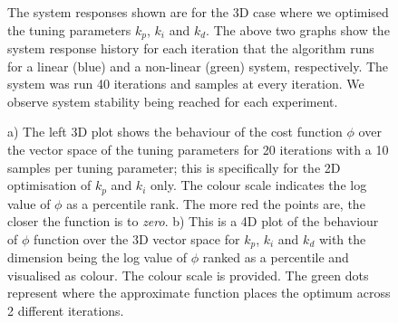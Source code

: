 \documentclass[conference]{IEEEtran}
\theoremstyle{definition}
\begin{document}
\begin{figure}[h]
    \caption{The system responses shown are for the 3D case where we optimised the tuning parameters $k_p$, $k_i$ and $k_d$. The above two graphs show the system response history for each iteration that the algorithm runs for a linear (blue) and a non-linear (green) system, respectively. The system was run 40 iterations and samples at every  iteration. We observe system stability being reached for each experiment.}
    \label{kpkikd}
\end{figure}

\begin{figure}[h]
    \caption{a) The left 3D plot shows the behaviour of the cost function $\phi$ over the vector space of the tuning parameters for 20 iterations with a 10 samples per tuning parameter; this is specifically for the 2D optimisation of $k_p$ and $k_i$ only. The colour scale indicates the log value of $\phi$ as a percentile rank. The more red the points are, the closer the function is to \textit{zero}. b) This is a 4D plot of the behaviour of $\phi$ function over the 3D vector space for $k_p$, $k_i$ and $k_d$ with the  dimension being the log value of $\phi$ ranked as a percentile and visualised as colour. The colour scale is provided. The green dots represent where the approximate function places the optimum across 2 different iterations.}
    \label{3D_plots}
\end{figure}
\end{document}
